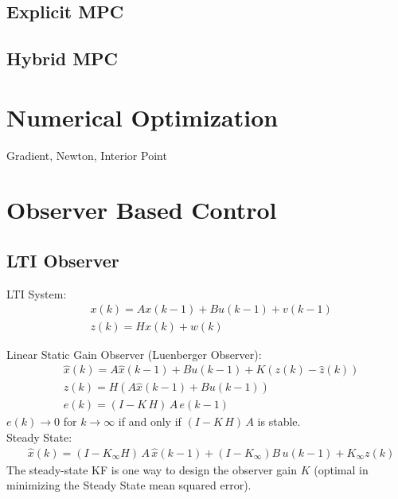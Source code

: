\documentclass[landscape,a4paper,8pt]{scrartcl}
\begin{document}
\begin{multicols*}{3}
\subsection{Explicit MPC}

\subsection{Hybrid MPC}

\section{Numerical Optimization}
Gradient, Newton, Interior Point


\section{Observer Based Control}
\subsection{LTI Observer}
LTI System: 
\begin{align*}
& x(k) = A x(k-1) + B u (k-1) + v(k-1) \\
& z(k) = H x(k) + w(k)
\end{align*}

Linear Static Gain Observer (Luenberger Observer):
\begin{align*}
&\hat{x}(k) = A \hat{x}(k-1) + B u (k-1) + K(z(k) - \hat{z}(k)) \\
&\hat{z}(k) = H ( A \hat{x}(k-1) + B u(k-1)) \\
&e(k)= (I-K \, H)\, A \,  e(k-1)
\end{align*}
$e(k) \to 0$ for $k \to \infty$ if and only if $(I-K \, H)\, A$ is stable.\\

Steady State: 
\begin{align*}
&\hat{x}(k) = (I-K_\infty H )\, A\, \hat{x}(k-1) + (I-K_\infty) B \, u(k-1) + K_\infty z(k)
\end{align*}
The steady-state KF is one way to design the observer gain $K$ (optimal in minimizing the Steady State mean squared error). \\





\end{multicols*}
\end{document}

